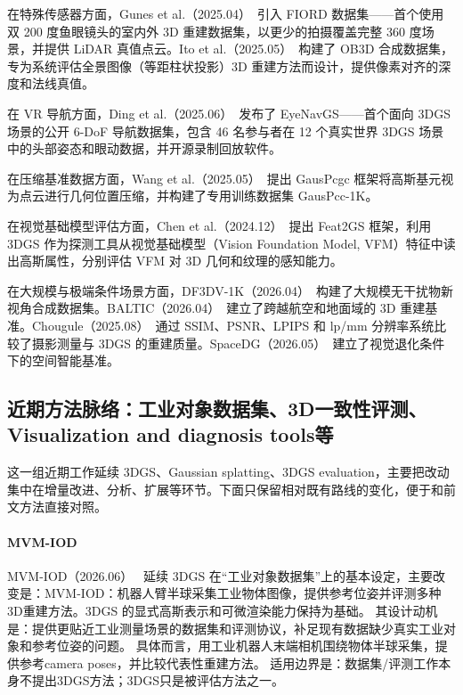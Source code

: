 在特殊传感器方面，Gunes et al.（2025.04）~\cite{2504_01732}引入 FIORD 数据集——首个使用双 200 度鱼眼镜头的室内外 3D 重建数据集，以更少的拍摄覆盖完整 360 度场景，并提供 LiDAR 真值点云。Ito et al.（2025.05）~\cite{2505_20126}构建了 OB3D 合成数据集，专为系统评估全景图像（等距柱状投影）3D 重建方法而设计，提供像素对齐的深度和法线真值。

在 VR 导航方面，Ding et al.（2025.06）~\cite{2506_02380}发布了 EyeNavGS——首个面向 3DGS 场景的公开 6-DoF 导航数据集，包含 46 名参与者在 12 个真实世界 3DGS 场景中的头部姿态和眼动数据，并开源录制回放软件。

在压缩基准数据方面，Wang et al.（2025.05）~\cite{2505_18197}提出 GausPcgc 框架将高斯基元视为点云进行几何位置压缩，并构建了专用训练数据集 GausPcc-1K。

在视觉基础模型评估方面，Chen et al.（2024.12）~\cite{2412_09606}提出 Feat2GS 框架，利用 3DGS 作为探测工具从视觉基础模型（Vision Foundation Model, VFM）特征中读出高斯属性，分别评估 VFM 对 3D 几何和纹理的感知能力。

在大规模与极端条件场景方面，DF3DV-1K（2026.04）~\cite{2604_13416}构建了大规模无干扰物新视角合成数据集。BALTIC（2026.04）~\cite{2604_19133}建立了跨越航空和地面域的 3D 重建基准。Chougule（2025.08）~\cite{2508_07483}通过 SSIM、PSNR、LPIPS 和 lp/mm 分辨率系统比较了摄影测量与 3DGS 的重建质量。SpaceDG（2026.05）~\cite{2605_22536}建立了视觉退化条件下的空间智能基准。


\subsection{近期方法脉络：工业对象数据集、3D一致性评测、Visualization and diagnosis tools等}

这一组近期工作延续 3DGS、Gaussian splatting、3DGS evaluation，主要把改动集中在增量改进、分析、扩展等环节。下面只保留相对既有路线的变化，便于和前文方法直接对照。

\paragraph{MVM-IOD}
MVM-IOD（2026.06）~\cite{2606_16638} 延续 3DGS 在“工业对象数据集”上的基本设定，主要改变是：MVM-IOD：机器人臂半球采集工业物体图像，提供参考位姿并评测多种3D重建方法。3DGS 的显式高斯表示和可微渲染能力保持为基础。
其设计动机是：提供更贴近工业测量场景的数据集和评测协议，补足现有数据缺少真实工业对象和参考位姿的问题。
具体而言，用工业机器人末端相机围绕物体半球采集，提供参考camera poses，并比较代表性重建方法。
适用边界是：数据集/评测工作本身不提出3DGS方法；3DGS只是被评估方法之一。

